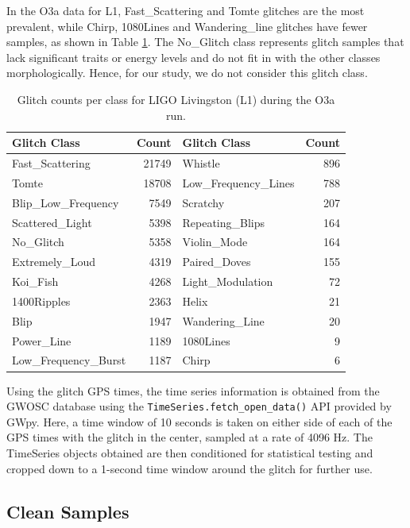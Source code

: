 \documentclass[12pt]{article}
\begin{document}
\medskip
\noindent In the O3a data for L1, Fast\_Scattering and Tomte glitches are the most prevalent, while Chirp, 1080Lines and Wandering\_line glitches have fewer samples, as shown in Table \ref{tab:glitch_classes}. The No\_Glitch class represents glitch samples that lack significant traits or energy levels and do not fit in with the other classes morphologically. Hence, for our study, we do not consider this glitch class.

\begin{table}[H]
    \centering
    \begin{tabular}{lr|lr}
    \toprule
    Glitch Class & Count & Glitch Class & Count \\
    \midrule
    Fast\_Scattering & 21749 & Whistle & 896 \\
    Tomte & 18708 & Low\_Frequency\_Lines & 788\\
    Blip\_Low\_Frequency & 7549 & Scratchy & 207 \\
    Scattered\_Light & 5398 & Repeating\_Blips & 164 \\
    No\_Glitch & 5358 & Violin\_Mode & 164 \\
    Extremely\_Loud & 4319 & Paired\_Doves & 155 \\
    Koi\_Fish & 4268 & Light\_Modulation & 72 \\
    1400Ripples & 2363 & Helix & 21 \\
    Blip & 1947 & Wandering\_Line & 20 \\
    Power\_Line & 1189 & 1080Lines & 9 \\
    Low\_Frequency\_Burst & 1187 & Chirp & 6 \\
    \bottomrule
    \end{tabular}
    \caption{Glitch counts per class for LIGO Livingston (L1) during the O3a run.}
    \label{tab:glitch_classes}
\end{table}

\pagebreak
\noindent Using the glitch GPS times, the time series information is obtained from the GWOSC database using the \texttt{TimeSeries.fetch\_open\_data()} API provided by GWpy. Here, a time window of 10 seconds is taken on either side of each of the GPS times with the glitch in the center, sampled at a rate of 4096 Hz. The TimeSeries objects obtained are then conditioned for statistical testing and cropped down to a 1-second time window around the glitch for further use.

\subsection{Clean Samples}
\end{document}
